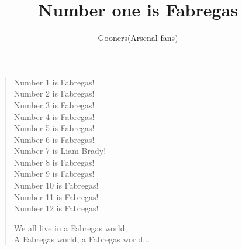 \documentclass[a4paper,12pt]{article}
\title{Number one is Fabregas}
\author{Gooners(Arsenal fans)}
\date{}
\begin{document}
	
	\maketitle
	
	\begin{verse}
		
		Number 1 is Fabregas! \\
		Number 2 is Fabregas! \\
		Number 3 is Fabregas! \\
		Number 4 is Fabregas! \\
		Number 5 is Fabregas! \\
		Number 6 is Fabregas! \\
		Number 7 is Liam Brady! \\
		Number 8 is Fabregas! \\
		Number 9 is Fabregas! \\
		Number 10 is Fabregas! \\
		Number 11 is Fabregas! \\
		Number 12 is Fabregas!\par
		We all live in a Fabregas world, \\
		A Fabregas world, a Fabregas world$\ldots$
		
	\end{verse}
	
\end{document}

